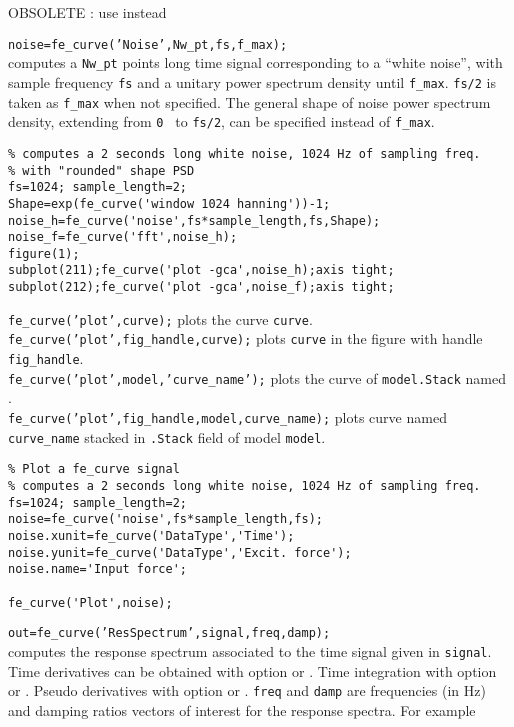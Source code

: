 OBSOLETE : use  instead

{\tt noise=fe\_curve('Noise',Nw\_pt,fs,f\_max);} \\
computes a {\tt Nw\_pt} points long time signal corresponding to a ``white noise'', with sample frequency {\tt fs} and a unitary power spectrum density until {\tt f\_max}. {\tt fs/2} is taken as {\tt f\_max} when not specified. The general shape of noise power spectrum density, extending from {\tt 0 } to {\tt fs/2}, can be specified instead of {\tt f\_max}.

\begin{verbatim}
% computes a 2 seconds long white noise, 1024 Hz of sampling freq.
% with "rounded" shape PSD    
fs=1024; sample_length=2;
Shape=exp(fe_curve('window 1024 hanning'))-1; 
noise_h=fe_curve('noise',fs*sample_length,fs,Shape);
noise_f=fe_curve('fft',noise_h);
figure(1);
subplot(211);fe_curve('plot -gca',noise_h);axis tight;
subplot(212);fe_curve('plot -gca',noise_f);axis tight;
\end{verbatim}%



{\tt fe\_curve('plot',curve);} plots the curve {\tt curve}. \\
{\tt fe\_curve('plot',fig\_handle,curve);} plots {\tt curve} in the figure with handle {\tt fig\_handle}.\\
{\tt fe\_curve('plot',model,'curve\_name');} plots the curve of {\tt model.Stack} named .\\
{\tt fe\_curve('plot',fig\_handle,model,curve\_name);} plots curve named {\tt curve\_name} stacked in {\tt .Stack} field of model {\tt model}.

\begin{verbatim}
% Plot a fe_curve signal
% computes a 2 seconds long white noise, 1024 Hz of sampling freq.
fs=1024; sample_length=2;
noise=fe_curve('noise',fs*sample_length,fs);
noise.xunit=fe_curve('DataType','Time');
noise.yunit=fe_curve('DataType','Excit. force');
noise.name='Input force';

fe_curve('Plot',noise);
\end{verbatim}%
 


{\tt out=fe\_curve('ResSpectrum',signal,freq,damp);} \\
computes the response spectrum associated to the time signal given in {\tt signal}. Time derivatives can be obtained with option  or . Time integration with option  or . Pseudo derivatives with option  or . {\tt freq} and {\tt damp} are frequencies (in Hz) and damping ratios vectors of interest for the response spectra. For example

